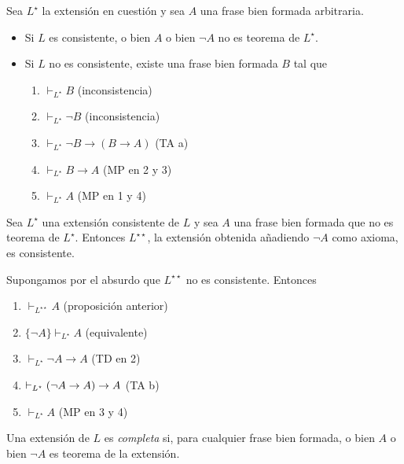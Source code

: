 \begin{prove}
Sea $L^\star$ la extensión en cuestión y sea $A$ una frase bien formada arbitraria.
\begin{itemize}
    \item Si $L$ es consistente, o bien $A$ o bien $\neg A$ no es teorema de $L^\star$.
    \item Si $L$ no es consistente, existe una frase bien formada $B$ tal que
    \begin{enumerate}
        \item $\vdash_{L^\star} B$                    \hfill (inconsistencia)
        \item $\vdash_{L^\star} \neg B$               \hfill (inconsistencia)
        \item $\vdash_{L^\star} \neg B \to (B \to A)$ \hfill (TA a)
        \item $\vdash_{L^\star} B \to A$              \hfill (MP en 2 y 3)
        \item $\vdash_{L^\star} A$                    \hfill (MP en 1 y 4)
    \end{enumerate}
\end{itemize}
\end{prove}

\begin{proposition}
Sea $L^\star$ una extensión consistente de $L$ y sea $A$ una frase bien formada que no es teorema de $L^\star$. Entonces $L^{\star \star}$, la extensión obtenida añadiendo $\neg A$ como axioma, es consistente.
\end{proposition}

\begin{prove}
Supongamos por el absurdo que $L^{\star \star}$ no es consistente. Entonces
\begin{enumerate}
    \item $\vdash_{L^{\star \star}} A$      \hfill (proposición anterior)
    \item $\{ \neg A \} \vdash_{L^\star} A$ \hfill (equivalente)
    \item $\vdash_{L^\star} \neg A \to A$   \hfill (TD en 2)
    \item $\vdash_{L^\star} (\neg A \to A) \to A$          \hfill (TA b)
    \item $\vdash_{L^\star} A$              \hfill (MP en 3 y 4)
\end{enumerate}
\end{prove}

\begin{definition}
Una extensión de $L$ es \textit{completa} si, para cualquier frase bien formada, o bien $A$ o bien $\neg A$ es teorema de la extensión.
\end{definition}

